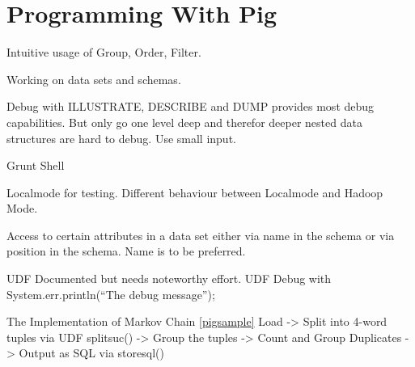 \section{Programming With Pig}

Intuitive usage of Group, Order, Filter.

Working on data sets and schemas.

Debug with ILLUSTRATE, DESCRIBE and DUMP provides most debug capabilities. But only go one level deep and therefor deeper nested data structures are hard to debug. Use small input. 

Grunt Shell

Localmode for testing. Different behaviour between Localmode and Hadoop Mode.

Access to certain attributes in a data set either via name in the schema or via position in the schema. Name is to be preferred.

UDF Documented but needs noteworthy effort.
UDF Debug with System.err.println(``The debug message'');                    

The Implementation of Markov Chain \ref{pigsample}
Load -> Split into 4-word tuples via UDF splitsuc() -> Group the tuples -> Count and Group Duplicates -> Output as SQL via storesql()